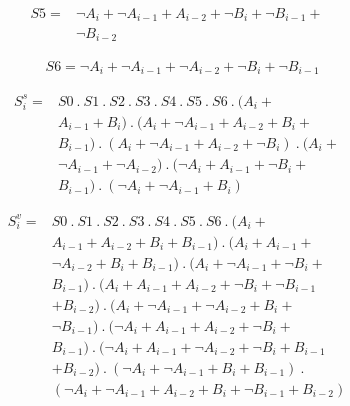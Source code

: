 \documentclass[conference]{IEEEtran}
\begin{document}
\vspace{-1em}
\begin{equation}
\begin{aligned}
S5 = &\neg A_{i} + \neg A_{i-1} + A_{i-2} + \neg B_{i} + \neg B_{i-1} + \\
&\neg B_{i-2}
\end{aligned}
\end{equation}

\vspace{-1em}
\begin{align}
&S6 = \neg A_{i} + \neg A_{i-1} + \neg A_{i-2} + \neg B_{i} + \neg B_{i-1}
\end{align}

\vspace{-1em}
\begin{equation}
\begin{aligned}
S_{i}^{s} ={} &S0 \ . \ S1 \ . \ S2 \ . \ S3 \ . \ S4 \ . \ S5 \ . \ S6 \ . \ (A_{i} + \\
&A_{i-1} + B_{i}) \ . \ (A_{i} + \neg A_{i-1} + A_{i-2} + B_{i} + \\
&B_{i-1}) \ . \ (A_{i} + \neg A_{i-1} + A_{i-2} + \neg B_{i}) \ . \ (A_{i} + \\
&\neg A_{i-1} + \neg A_{i-2}) \ . \ ( \neg A_{i} + A_{i-1} + \neg B_{i} + \\
&B_{i-1}) \ . \ ( \neg A_{i} + \neg A_{i-1} + B_{i})
\end{aligned}
\end{equation}

\vspace{-1em}
\begin{equation}
\begin{aligned}
S_{i}^{v} ={} &S0 \ . \ S1 \ . \ S2 \ . \ S3 \ . \ S4 \ . \ S5 \ . \ S6 \ . \ (A_{i} + \\
&A_{i-1} + A_{i-2} + B_{i} + B_{i-1}) \ . \ (A_{i} + A_{i-1} + \\
&\neg A_{i-2} + B_{i} + B_{i-1}) \ . \ (A_{i} + \neg A_{i-1} + \neg B_{i} + \\
&B_{i-1}) \ . \ (A_{i} + A_{i-1} + A_{i-2} + \neg B_{i} + \neg B_{i-1} \\
&+ B_{i-2}) \ . \ (A_{i} + \neg A_{i-1} + \neg A_{i-2} + B_{i} + \\
&\neg B_{i-1}) \ . \ ( \neg A_{i} + A_{i-1} + A_{i-2} + \neg B_{i} + \\
&B_{i-1}) \ . \ (\neg A_{i} + A_{i-1} + \neg A_{i-2} + \neg B_{i} + B_{i-1} \\
&+ B_{i-2}) \ . \ ( \neg A_{i} + \neg A_{i-1} + B_{i} + B_{i-1}) \ . \ \\
&( \neg A_{i} + \neg A_{i-1} + A_{i-2} + B_{i} + \neg B_{i-1} + B_{i-2})
\end{aligned}
\end{equation}
\end{document}
